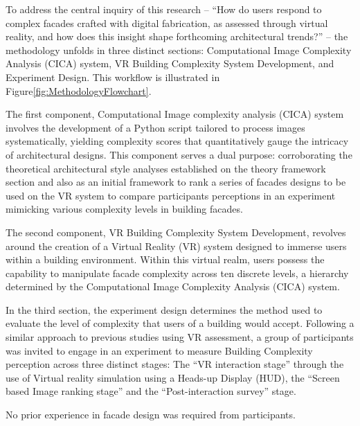 
To address the central inquiry of this research – ``How do users respond to complex facades crafted with digital fabrication, as assessed through virtual reality, and how does this insight shape forthcoming architectural trends?'' – the methodology unfolds in three distinct sections: Computational Image Complexity Analysis (CICA) system, VR Building Complexity System Development, and Experiment Design.
This workflow is illustrated in Figure\ref{fig:MethodologyFlowchart}.

The first component, Computational Image complexity analysis (CICA) system involves the development of a Python script tailored to process images systematically, yielding complexity scores that quantitatively gauge the intricacy of architectural designs.
This component serves a dual purpose: corroborating the theoretical architectural style analyses established on the theory framework section and also as an initial framework to rank a series of facades designs to be used on the VR system to compare participants perceptions in an experiment mimicking various complexity levels in building facades.

The second component, VR Building Complexity System Development, revolves around the creation of a Virtual Reality (VR) system designed to immerse users within a building environment.
Within this virtual realm, users possess the capability to manipulate facade complexity across ten discrete levels, a hierarchy determined by the Computational Image Complexity Analysis (CICA) system.

In the third section, the experiment design determines the method used to evaluate the level of complexity that users of a building would accept.
Following a similar approach to previous studies using VR assessment\cite{Wolfartsberger2019}, a group of participants was invited to engage in an experiment to measure Building Complexity perception across three distinct stages: The ``VR interaction stage'' through the use of Virtual reality simulation using a Heads-up Display (HUD), the ``Screen based Image ranking stage'' and the ``Post-interaction survey'' stage.

No prior experience in facade design was required from participants.


